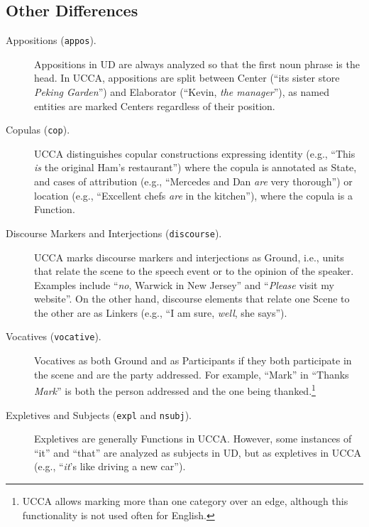 \documentclass[11pt,a4paper]{article}
\newcommand{\oa}[1]{\footnote{\color{red}OA: #1}}
\begin{document}
    

\subsection{Other Differences}\label{sec:misc}

\begin{description}

    \item[Appositions (\texttt{appos}).]
    Appositions in UD are always analyzed so that the first
    noun phrase is the head. 
    In UCCA, appositions are split between Center
    (``its sister store \textit{Peking Garden}'')
    and Elaborator (``Kevin, \textit{the manager}''),
    as named entities are marked Centers regardless of their position.

    \item[Copulas (\texttt{cop}).]
    UCCA distinguishes copular constructions expressing
    identity (e.g., ``This \textit{is} the original Ham's restaurant'') where the copula is annotated as State,
    and cases of attribution 
    (e.g., ``Mercedes and Dan \textit{are} very thorough'')
    or location (e.g., ``Excellent chefs \textit{are} in the kitchen''),
    where the copula is a Function.
    

    \item[Discourse Markers and Interjections (\texttt{discourse}).] 
    UCCA marks discourse markers and interjections as Ground, i.e., units that relate the scene 
    to the speech event or to the opinion of the speaker. Examples include ``\textit{no}, Warwick in New Jersey'' and ``\textit{Please} visit my website''.
    On the other hand, discourse elements that relate one Scene to the other 
    are as Linkers (e.g., ``I am sure, \textit{well}, she says'').

    \item[Vocatives (\texttt{vocative}).]
    Vocatives as both Ground and as Participants if they both participate in the scene and are the party addressed.
    For example, ``Mark'' in ``Thanks \textit{Mark}'' is both the person addressed and the one 
    being thanked.\footnote{UCCA allows marking more than one category over an edge, although this
    functionality is not used often for English.}

    
    
    
    \item[Expletives and Subjects (\texttt{expl} and \texttt{nsubj}).]
    Expletives are generally Functions in UCCA.
    However, some instances of ``it'' and ``that'' are analyzed as subjects in UD,
    but as expletives in UCCA (e.g., ``\textit{it}'s like driving a new car'').    


\end{description}
\end{document}
